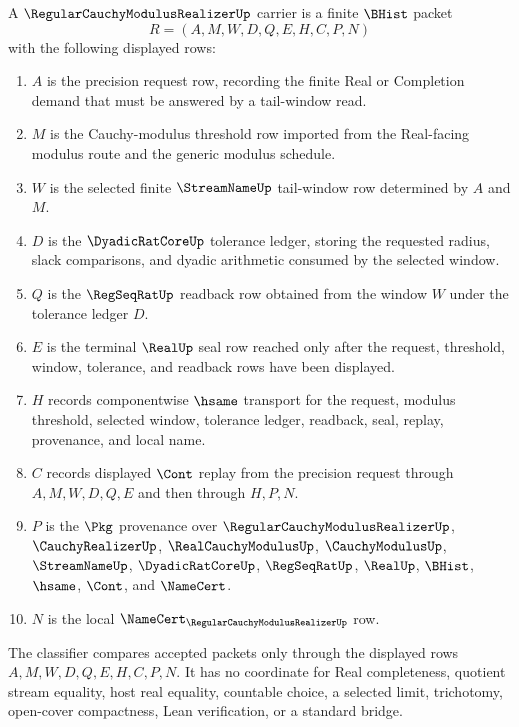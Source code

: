 \begin{definition}
\label{def:regular-cauchy-modulus-realizer-carrier}
A $\RegularCauchyModulusRealizerUp$ carrier is a finite $\BHist$ packet
$$
R=(A,M,W,D,Q,E,H,C,P,N)
$$
with the following displayed rows:
\begin{enumerate}
\item $A$ is the precision request row, recording the finite Real or Completion demand that must be answered by a tail-window read.
\item $M$ is the Cauchy-modulus threshold row imported from the Real-facing modulus route and the generic modulus schedule.
\item $W$ is the selected finite $\StreamNameUp$ tail-window row determined by $A$ and $M$.
\item $D$ is the $\DyadicRatCoreUp$ tolerance ledger, storing the requested radius, slack comparisons, and dyadic arithmetic consumed by the selected window.
\item $Q$ is the $\RegSeqRatUp$ readback row obtained from the window $W$ under the tolerance ledger $D$.
\item $E$ is the terminal $\RealUp$ seal row reached only after the request, threshold, window, tolerance, and readback rows have been displayed.
\item $H$ records componentwise $\hsame$ transport for the request, modulus threshold, selected window, tolerance ledger, readback, seal, replay, provenance, and local name.
\item $C$ records displayed $\Cont$ replay from the precision request through $A,M,W,D,Q,E$ and then through $H,P,N$.
\item $P$ is the $\Pkg$ provenance over $\RegularCauchyModulusRealizerUp$, $\CauchyRealizerUp$, $\RealCauchyModulusUp$, $\CauchyModulusUp$, $\StreamNameUp$, $\DyadicRatCoreUp$, $\RegSeqRatUp$, $\RealUp$, $\BHist$, $\hsame$, $\Cont$, and $\NameCert$.
\item $N$ is the local $\NameCert_{\RegularCauchyModulusRealizerUp}$ row.
\end{enumerate}
The classifier compares accepted packets only through the displayed rows $A,M,W,D,Q,E,H,C,P,N$. It has no coordinate for Real completeness, quotient stream equality, host real equality, countable choice, a selected limit, trichotomy, open-cover compactness, Lean verification, or a standard bridge.
\end{definition}

